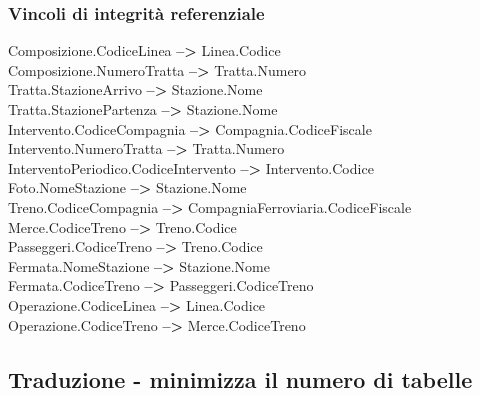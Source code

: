 \documentclass{article}
\begin{document}
\subsubsection*{Vincoli di integrità referenziale}
Composizione.CodiceLinea \textbf{-->} Linea.Codice \vspace*{3pt}\\
Composizione.NumeroTratta \textbf{-->} Tratta.Numero \vspace*{3pt}\\
Tratta.StazioneArrivo \textbf{-->} Stazione.Nome \vspace*{3pt}\\
Tratta.StazionePartenza \textbf{-->} Stazione.Nome \vspace*{3pt}\\
Intervento.CodiceCompagnia \textbf{-->} Compagnia.CodiceFiscale \vspace*{3pt}\\
Intervento.NumeroTratta \textbf{-->} Tratta.Numero \vspace*{3pt}\\
InterventoPeriodico.CodiceIntervento \textbf{-->} Intervento.Codice \vspace*{3pt}\\
Foto.NomeStazione \textbf{-->} Stazione.Nome \vspace*{3pt}\\
Treno.CodiceCompagnia \textbf{-->} CompagniaFerroviaria.CodiceFiscale \vspace*{3pt}\\
Merce.CodiceTreno \textbf{-->} Treno.Codice \vspace*{3pt}\\
Passeggeri.CodiceTreno \textbf{-->} Treno.Codice \vspace*{3pt}\\
Fermata.NomeStazione \textbf{-->} Stazione.Nome \vspace*{3pt}\\
Fermata.CodiceTreno \textbf{-->} Passeggeri.CodiceTreno \vspace*{3pt}\\
Operazione.CodiceLinea \textbf{-->} Linea.Codice \vspace*{3pt}\\
Operazione.CodiceTreno \textbf{-->} Merce.CodiceTreno \vspace*{3pt}\\

\subsection*{Traduzione - minimizza il numero di tabelle}
\large
\end{document}
